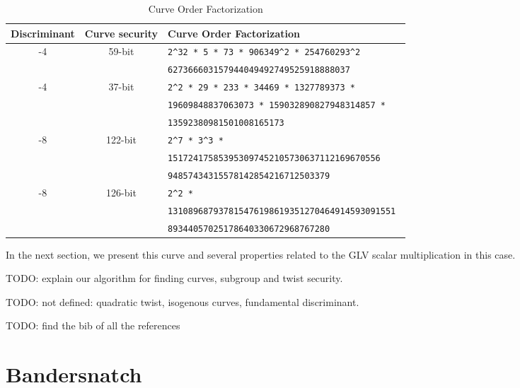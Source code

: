 \documentclass{amsart}
\newcommand{\SM}[1]{\color{blue}#1\color{black}}
\begin{document}
\begin{table*}[ht]
    \centering\footnotesize
    \begin{tabularx}{\textwidth}{ccl}
        \toprule
                            
        \textbf{Discriminant}    & \textbf{Curve security}  & \textbf{Curve Order Factorization} \\
        \midrule
        -4  &  59-bit & \tt 2\^{}32 * 5 * 73 * 906349\^{}2 * 254760293\^{}2 \\
                              &   & \tt  627366603157944049492749525918888037 \\
        -4  &  37-bit & \tt 2\^{}2 * 29 * 233 * 34469 * 1327789373 *  \\
         		&   & \tt  19609848837063073 * 159032890827948314857 *  \\
                              &   & \tt  13592380981501008165173 \\
        -8  &  122-bit & \tt 2\^{}7 * 3\^{}3 * \\
                              &   & \tt  151724175853953097452105730637112169670556  \\
                              &   & \tt   94857434315578142854216712503379 \\
        -8  &  126-bit & \tt 2\^{}2 *  \\
         		&   & \tt  131089687937815476198619351270464914593091551  \\
                              &   & \tt  89344057025178640330672968767280 \\                              
        \bottomrule
    \end{tabularx}
    \caption{Curve Order Factorization}
    \label{tab:group-order-factorization}
\end{table*}

In the next section, we present this curve and several properties
related to the  GLV scalar multiplication in this case.

\SM{TODO: explain our algorithm for finding curves, subgroup and twist
  security.}

\SM{TODO: not defined: quadratic twist, isogenous curves, fundamental
  discriminant.}

\SM{TODO: find the bib of all the references}

\section{Bandersnatch} 
\end{document}
